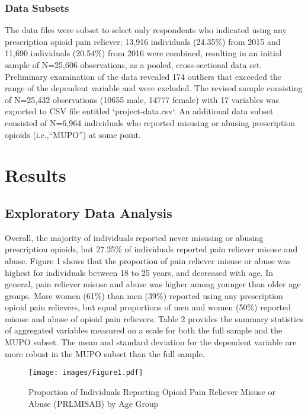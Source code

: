 \documentclass[sigconf]{acmart}
\begin{document}

\subsubsection{Data Subsets} 
 
The data files were subset to select only respondents who indicated using
any prescription opioid pain reliever; 13,916 individuals (24.35\%) from 2015 
and 11,690 individuals (20.54\%) from 2016 were combined, resulting in an
initial sample of N=25,606 observations, as a pooled, cross-sectional data set.
Preliminary examination of the data revealed 174 outliers that exceeded the 
range of the dependent variable and were excluded. The revised sample consisting
of N=25,432 observations (10655 male, 14777 female) with 17 variables was 
exported to CSV file entitled `project-data.csv`. An additional data subset
consisted of N=6,964 individuals who reported misusing or abusing prescription 
opioids (i.e.,``MUPO'') at some point. 

\section{Results}

\subsection{Exploratory Data Analysis}

Overall, the majority of individuals reported never misusing or abusing 
prescription opioids, but 27.25\% of individuals reported pain reliever misuse
and abuse. Figure 1 shows that the proportion of pain reliever misuse 
or abuse was highest for individuals between 18 to 25 years, and decreased
with age. In general, pain reliever misuse and abuse was higher among younger 
than older age groups. More women (61\%) than men (39\%) reported using any
prescription opioid pain relievers, but equal proportions of men and women 
(50\%) reported misuse and abuse of opioid pain relievers. Table 2 provides 
the summary statistics of aggregated variables measured on a scale for both the 
full sample and the MUPO subset. The mean and standard deviation for the 
dependent variable are more robust in the MUPO subset than the full sample.  

\begin{figure}[!ht]
  \centering\texttt{[image: images/Figure1.pdf]}
  \caption{Proportion of Individuals Reporting Opioid Pain Reliever Misuse 
  or Abuse (PRLMISAB) by Age Group}
  \label{f:Figure1}
\end{figure}
\end{document}
